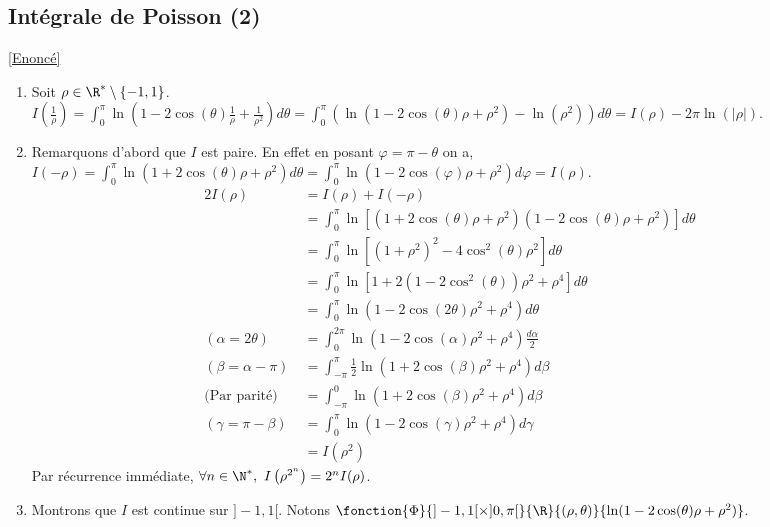 \documentclass{book}
\begin{document}
	\subsection{Intégrale de Poisson (2) }\label{sec:integrale-de-poisson-2-etoile3}
	\textcolor{blue}{\hyperref[intpoisson2]{[Enoncé]}}\\
	\begin{enumerate}[leftmargin=*\\]
		\item Soit $\rho\in \R^*\setminus\{-1,1\}$.\\
		$I\left(\displaystyle\frac{1}{\rho}\right)=\displaystyle\int_0^\pi \ln\left(1-2\cos(\theta)\frac{1}{\rho}+\frac{1}{\rho^2}\right)d\theta=\displaystyle\int_0^\pi \left(\ln(1-2\cos(\theta)\rho+\rho^2)-\ln(\rho^2)\right)d\theta=I(\rho)-2\pi\ln(|\rho|)$.
		\item Remarquons d'abord que $I$ est paire. En effet en posant $\varphi=\pi-\theta$ on a,\\
		$I(-\rho)=\displaystyle\int_0^\pi \ln(1+2\cos(\theta)\rho+\rho^2)d\theta=\displaystyle\int_0^\pi \ln(1-2\cos(\varphi)\rho+\rho^2)d\varphi=I(\rho)$.
		\begin{align*}
			2I(\rho)&=I(\rho)+I(-\rho)\\
			&=\displaystyle\int_0^\pi \ln\left[(1+2\cos(\theta)\rho+\rho^2)(1-2\cos(\theta)\rho+\rho^2)\right]d\theta\\
			&=\displaystyle\int_0^\pi \ln\left[(1+\rho^2)^2-4\cos^2(\theta)\rho^2\right]d\theta\\
			&=\displaystyle\int_0^\pi \ln\left[1+2(1-2\cos^2(\theta))\rho^2+\rho^4\right]d\theta\\
			&=\displaystyle\int_0^\pi \ln(1-2\cos(2\theta)\rho^2+\rho^4)d\theta\\
			(\alpha=2\theta)\ &=\displaystyle\int_0^{2\pi} \ln(1-2\cos(\alpha)\rho^2+\rho^4)\frac{d\alpha}{2}\\
			(\beta=\alpha-\pi)\ &=\displaystyle\int_{-\pi}^\pi \frac{1}{2}\ln(1+2\cos(\beta)\rho^2+\rho^4)d\beta\\
			\text{(Par parité)}\ &=\displaystyle\int_{-\pi}^0 \ln(1+2\cos(\beta)\rho^2+\rho^4)d\beta\\
			(\gamma=\pi-\beta)\ &=\displaystyle\int_{0}^\pi \ln(1-2\cos(\gamma)\rho^2+\rho^4)d\gamma\\
			&=I(\rho^2)
		\end{align*}
		Par récurrence immédiate, $\forall n\in \N^*,\ I\left(\rho^{2^n}\right)=2^nI(\rho)$.
		\item Montrons que $I$ est continue sur $]-1,1[$. Notons $\fonction{\Phi}{]-1,1[\times]0,\pi[}{\R}{(\rho,\theta)}{\ln(1-2\cos(\theta)\rho+\rho^2)}$.\\

\end{enumerate}
\end{document}
